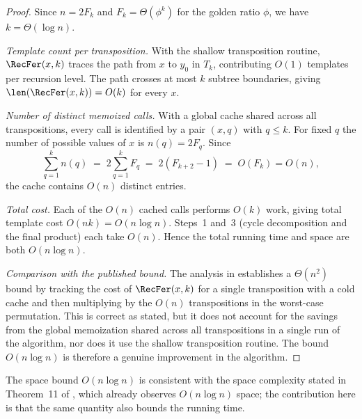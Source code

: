 \begin{proof}
    Since $n = 2F_k$ and $F_k = \Theta(\phi^k)$ for the golden ratio $\phi$, we have $k = \Theta(\log n)$.

    \medskip
    \noindent\textit{Template count per transposition.}
    With the shallow transposition routine, $\RecFer(x,k)$ traces the path from $x$ to $y_0$ in $T_k$, contributing $O(1)$ templates per recursion level.
    The path crosses at most $k$ subtree boundaries, giving $\len(\RecFer(x,k)) = O(k)$ for every $x$.

    \medskip
    \noindent\textit{Number of distinct memoized calls.}
    With a global cache shared across all transpositions, every call is identified by a pair $(x, q)$ with $q \le k$.
    For fixed $q$ the number of possible values of $x$ is $n(q) = 2F_q$.
    Since
    $$
        \sum_{q=1}^{k} n(q)
        \;=\;
        2\sum_{q=1}^{k} F_q
        \;=\; 2(F_{k+2}-1)
        \;=\; O(F_k) = O(n),
    $$
    the cache contains $O(n)$ distinct entries.

    \medskip
    \noindent\textit{Total cost.}
    Each of the $O(n)$ cached calls performs $O(k)$ work, giving total template cost $O(nk) = O(n \log n)$.
    Steps~1 and~3 (cycle decomposition and the final product) each take $O(n)$.
    Hence the total running time and space are both $O(n \log n)$.

    \medskip
    \noindent\textit{Comparison with the published bound.}
    The analysis in \cite[Theorem~11]{Eslavaetal2025} establishes a $\Theta(n^2)$ bound by tracking the cost of $\RecFer(x,k)$ for a single transposition with a cold cache and then multiplying by the $O(n)$
    transpositions in the worst-case permutation.
    This is correct as stated, but it does not account for the savings from the global memoization shared across all transpositions in a single run of the algorithm, nor does it use the shallow transposition
    routine.
    The bound $O(n \log n)$ is therefore a genuine improvement in the algorithm.
\end{proof}
 
\begin{remark}
    The space bound $O(n \log n)$ is consistent with the space complexity stated in Theorem~11 of \cite{Eslavaetal2025}, which already observes $O(n \log n)$ space; the contribution here is that the same quantity also bounds the running time.
\end{remark}
